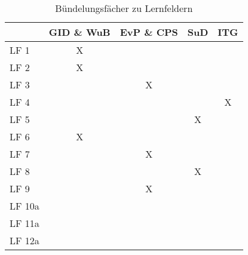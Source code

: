 \begin{table}[H]
    \centering
    \begin{tabulary}{\textwidth}{|L|C|C|C|C|}
         & GID \& WuB    & EvP \& CPS    & SuD   & ITG \\\hline
        LF 1            & X             &               &       &     \\\hline
        LF 2            & X             &               &       &     \\\hline
        LF 3            &               & X             &       &     \\\hline
        LF 4            &               &               &       & X   \\\hline
        LF 5            &               &               & X     &     \\\hline
        LF 6            & X             &               &       &     \\\hline
        LF 7            &               & X             &       &     \\\hline
        LF 8            &               &               & X     &     \\\hline
        LF 9            &               & X             &       &     \\\hline
        LF 10a          &               &               &       &     \\\hline
        LF 11a          &               &               &       &     \\\hline
        LF 12a          &               &               &       &     \\\hline
    \end{tabulary}
    \caption{Bündelungsfächer zu Lernfeldern}
    \label{tab:buendelfaecher}
\end{table}